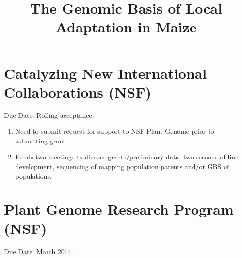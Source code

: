 \documentclass[]{article}
\begin{document}
\title{The Genomic Basis of Local Adaptation in Maize}

\maketitle

\section*{Catalyzing New International Collaborations (NSF)}
Due Date:  Rolling acceptance. 

\begin{enumerate}

\item Need to submit request for support to NSF Plant Genome prior to submitting grant.

\item Funds two meetings to discuss grants/preliminary data, two seasons of line development, sequencing of mapping population parents and/or GBS of populations.

\end{enumerate}

\section*{Plant Genome Research Program (NSF)}
Due Date: March 2014. 
\end{document}
